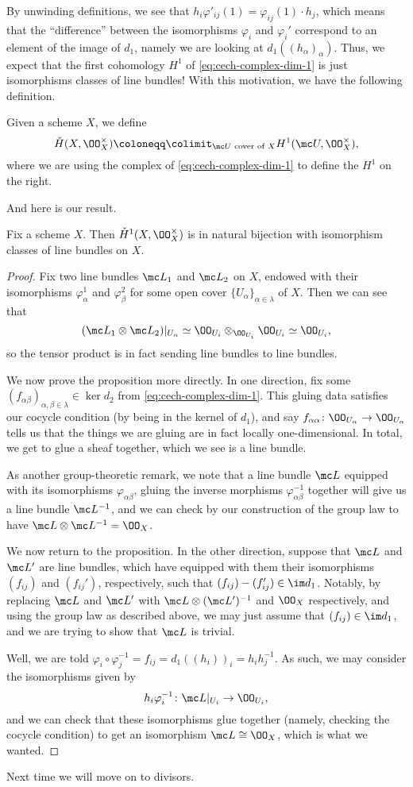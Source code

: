 \documentclass[../notes.tex]{subfiles}
\begin{document}
By unwinding definitions, we see that $h_i\varphi'_{ij}(1)=\varphi_{ij}(1)\cdot h_j$, which means that the ``difference'' between the isomorphisms $\varphi_i$ and $\varphi_i'$ correspond to an element of the image of $d_1$, namely we are looking at $d_1((h_\alpha)_\alpha)$. Thus, we expect that the first cohomology $H^1$ of \autoref{eq:cech-complex-dim-1} is just isomorphisms classes of line bundles! With this motivation, we have the following definition.
\begin{definition}
	Given a scheme $X$, we define
	\[\check H(X,\OO_X^\times)\coloneqq\colimit_{\mc U\text{ cover of }X}H^1(\mc U,\OO_X^\times),\]
	where we are using the complex of \autoref{eq:cech-complex-dim-1} to define the $H^1$ on the right.
\end{definition}
And here is our result.
\begin{proposition}
	Fix a scheme $X$. Then $\check H^1(X,\OO_X^\times)$ is in natural bijection with isomorphism classes of line bundles on $X$.
\end{proposition}
\begin{proof}
	Fix two line bundles $\mc L_1$ and $\mc L_2$ on $X$, endowed with their isomorphisms $\varphi^1_\alpha$ and $\varphi^2_\beta$ for some open cover $\{U_\alpha\}_{\alpha\in\lambda}$ of $X$. Then we can see that
	\[(\mc L_1\otimes\mc L_2)|_{U_\alpha}\simeq\OO_{U_i}\otimes_{\OO_{U_i}}\OO_{U_i}\simeq\OO_{U_i},\]
	so the tensor product is in fact sending line bundles to line bundles.

	We now prove the proposition more directly. In one direction, fix some $(f_{\alpha\beta})_{\alpha,\beta\in\lambda}\in\ker d_2$ from \autoref{eq:cech-complex-dim-1}. This gluing data satisfies our cocycle condition (by being in the kernel of $d_1$), and say $f_{\alpha\alpha}\colon\OO_{U_\alpha}\to\OO_{U_\alpha}$ tells us that the things we are gluing are in fact locally one-dimensional. In total, we get to glue a sheaf together, which we see is a line bundle.

	As another group-theoretic remark, we note that a line bundle $\mc L$ equipped with its isomorphisms $\varphi_{\alpha\beta}$, gluing the inverse morphisms $\varphi_{\alpha\beta}^{-1}$ together will give us a line bundle $\mc L^{-1}$, and we can check by our construction of the group law to have $\mc L\otimes\mc L^{-1}=\OO_X$.

	We now return to the proposition. In the other direction, suppose that $\mc L$ and $\mc L'$ are line bundles, which have equipped with them their isomorphisms $(f_{ij})$ and $(f_{ij}')$, respectively, such that $(f_{ij})-(f_{ij}')\in\im d_1$. Notably, by replacing $\mc L$ and $\mc L'$ with $\mc L\otimes(\mc L')^{-1}$ and $\OO_X$ respectively, and using the group law as described above, we may just assume that $(f_{ij})\in\im d_1$, and we are trying to show that $\mc L$ is trivial.

	Well, we are told $\varphi_i\circ\varphi_j^{-1}=f_{ij}=d_1((h_i))_i=h_ih_j^{-1}$. As such, we may consider the isomorphisms given by
	\[h_i\varphi_i^{-1}\colon\mc L|_{U_i}\to\OO_{U_i},\]
	and we can check that these isomorphisms glue together (namely, checking the cocycle condition) to get an isomorphism $\mc L\cong\OO_X$, which is what we wanted.
\end{proof}
Next time we will move on to divisors.
\end{document}
